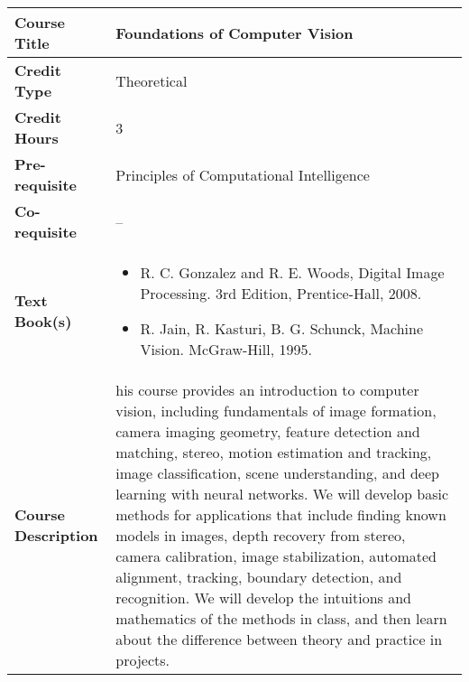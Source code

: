 \documentclass[11pt]{article}
\begin{document}
\begin{table}[h!]
\begin{tabular}{|l|l|}
\hline
\textbf{Course Title}       &   Foundations of Computer Vision\\ \hline
\textbf{Credit Type}        &  Theoretical \\ \hline
\textbf{Credit Hours}       &  3 \\ \hline
\textbf{Pre-requisite}       & Principles of Computational Intelligence \\ \hline
\textbf{Co-requisite}       &  -- \\ \hline
\textbf{Text Book(s)}       & \begin{minipage}{.70\textwidth}
\begin{itemize} \itemsep-0.4em
	\vspace{3mm}
	\item R. C. Gonzalez and R. E. Woods, Digital Image Processing. 3rd Edition, Prentice-Hall, 2008.
	\item R. Jain, R. Kasturi, B. G. Schunck, Machine Vision. McGraw-Hill, 1995.
	\vspace{3mm}
\end{itemize}
\end{minipage}\\ \hline
\textbf{Course Description} & \begin{minipage}{.70\textwidth}
\vspace{3mm}
his course provides an introduction to computer vision, including fundamentals of image formation, camera imaging geometry, feature detection and matching, stereo, motion estimation and tracking, image classification, scene understanding, and deep learning with neural networks. We will develop basic methods for applications that include finding known models in images, depth recovery from stereo, camera calibration, image stabilization, automated alignment, tracking, boundary detection, and recognition. We will develop the intuitions and mathematics of the methods in class, and then learn about the difference between theory and practice in projects.
\vspace{3mm}
\end{minipage} \\ \hline
\end{tabular}
\end{table}
\end{document}
